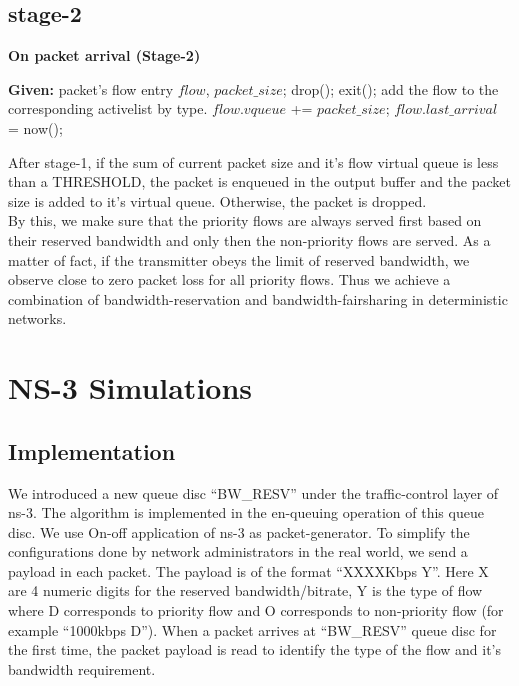 \documentclass[10pt,sigconf,letterpaper,anonymous]{acmart}
\begin{document}
\subsection {stage-2}

\begin{algorithm}
\caption{\textbf{On packet arrival (Stage-2)}}
\label {algo:stage2}
\begin{algorithmic}[1]
\STATE \textbf{Given:} packet's flow entry $flow$, $packet\_size$;
\STATE drop();
\STATE exit();
\ELSE
{}
\STATE add the flow to the corresponding activelist by type.
\ENDIF
\STATE $flow.vqueue$ += $packet\_size$;
\STATE $flow.last\_arrival$ = now();
\ENDIF
\end{algorithmic}
\end{algorithm}


After stage-1, if the sum of current packet size and it's flow virtual queue is less than a THRESHOLD, the packet is enqueued in the output buffer and the packet size is added to it's virtual queue. Otherwise, the packet is dropped.
\\

By this, we make sure that the priority flows are always served first based on their reserved bandwidth and only then the non-priority flows are served. As a matter of fact, if the transmitter obeys the limit of reserved bandwidth, we observe close to zero packet loss for all priority flows. Thus we achieve a combination of bandwidth-reservation and bandwidth-fairsharing in deterministic networks.



\section{NS-3 Simulations}

\subsection{Implementation}
We introduced a new queue disc ``BW\_RESV'' under the traffic-control layer of ns-3. The algorithm is implemented in the en-queuing operation of this queue disc. We use On-off application of ns-3 as packet-generator. To simplify the configurations done by network administrators in the real world, we send a payload in each packet. The payload is of the format ``XXXXKbps Y''. Here X are 4 numeric digits for the reserved bandwidth/bitrate, Y is the type of flow where D corresponds to priority flow and O corresponds to non-priority flow (for example ``1000kbps D''). When a packet arrives at ``BW\_RESV'' queue disc for the first time, the packet payload is read to identify the type of the flow and it's bandwidth requirement. 
\end{document}
